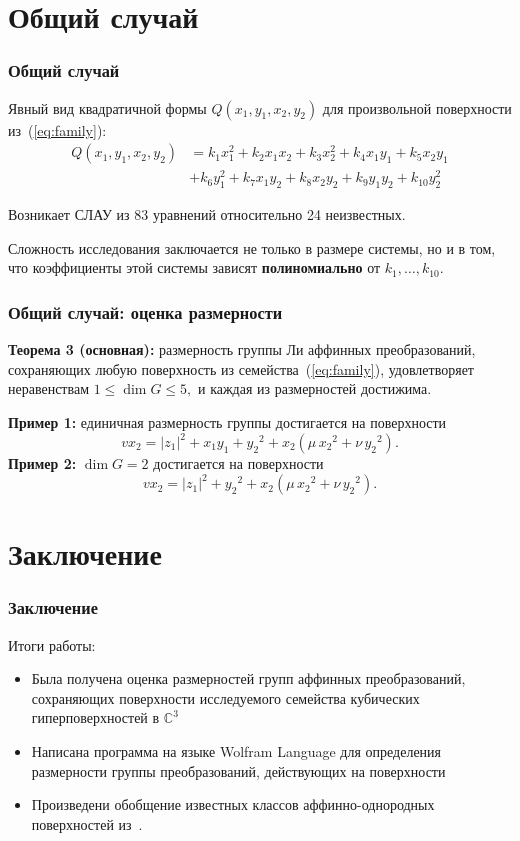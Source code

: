 \documentclass[russian,hyperref={unicode}]{beamer}
\begin{document}
\section{Общий случай}
\frame
{
	\frametitle{Общий случай}
	Явный вид квадратичной формы $Q(x_1, y_1, x_2, y_2)$ для произвольной поверхности из~(\ref{eq:family}):
	\begin{align*}
	Q(x_1, y_1, x_2, y_2) &= k_1 x_1^2 + k_2 x_1 x_2 + k_3 x_2^2 + k_4 x_1 y_1 + k_5 x_2 y_1 \nonumber\\&+ k_6 y_1^2 + k_7 x_1 y_2 + k_8 x_2 y_2 + k_9 y_1 y_2 + k_{10} y_2^2
	\end{align*}

	Возникает СЛАУ из 83 уравнений относительно 24 неизвестных.

	Сложность исследования заключается не только в размере системы, но и в том, что
	коэффициенты этой системы зависят \textbf{полиномиально} от $k_1, \dots,
	k_{10}$.
}
\frame
{
	\frametitle{Общий случай: оценка размерности}
	\textbf{Теорема 3 (основная):}
	размерность группы Ли аффинных преобразований, сохраняющих 	любую поверхность
	из семейства~(\ref{eq:family}), удовлетворяет неравенствам
	$
		1 \le \dim G \le 5,
	$ и каждая из размерностей достижима.

	\textbf{Пример 1:}
	единичная размерность группы достигается на поверхности
	$$
		v x_2 = {|z_1|}^2 +x_1 y_1 + {y_2}^2 + x_2 (\mu\,{x_2}^2 + \nu\,{y_2}^2).
	$$
	\textbf{Пример 2:}
	$\dim G = 2$ достигается на поверхности
	$$
		v x_2 = {|z_1|}^2 + {y_2}^2 + x_2 (\mu\,{x_2}^2 + \nu\,{y_2}^2).
	$$
}
\section{Заключение}
\frame
{
	\frametitle{Заключение}
	Итоги работы:
	\begin{itemize}
		\item Была получена оценка размерностей групп аффинных преобразований, сохраняющих поверхности исследуемого семейства кубических гиперповерхностей в $\mathbb{C}^3$
		\item Написана программа на языке {\ttfamily Wolfram Language} для определения размерности группы преобразований, действующих на поверхности
		\item Произведени обобщение известных классов аффинно-однородных поверхностей из~\cite{arxiv}.
	\end{itemize}

}
\end{document}
